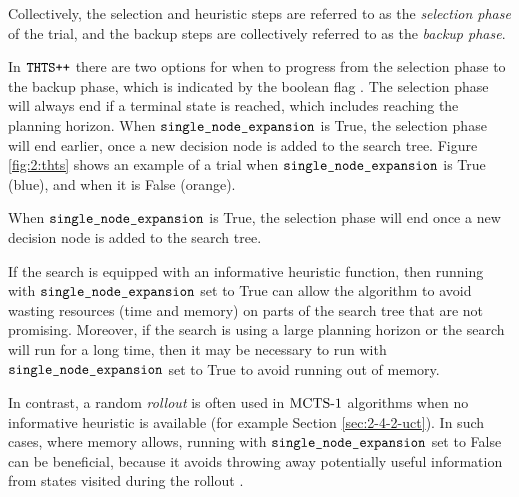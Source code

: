     Collectively, the selection and heuristic steps are referred to as the \textit{selection phase} of the trial, and the backup steps are collectively referred to as the \textit{backup phase}.

    In ${\textnormal{\texttt{THTS++}}}$ there are two options for when to progress from the selection phase to the backup phase, which is indicated by the boolean flag \mctsmode. The selection phase will always end if a terminal state is reached, which includes reaching the planning horizon. When ${\textnormal{\texttt{single\_node\_expansion}}}$ is True, the selection phase will end earlier, once a new decision node is added to the search tree. Figure \ref{fig:2:thts} shows an example of a trial when ${\textnormal{\texttt{single\_node\_expansion}}}$ is True (blue), and when it is False (orange).
    \begin{defn}
        \label{def:2:mctsmode}
        When ${\textnormal{\texttt{single\_node\_expansion}}}$ is True, the selection phase will end once a new decision node is added to the search tree.
    \end{defn} 

    If the search is equipped with an informative heuristic function, then running with ${\textnormal{\texttt{single\_node\_expansion}}}$ set to True can allow the algorithm to avoid wasting resources (time and memory) on parts of the search tree that are not promising. Moreover, if the search is using a large planning horizon or the search will run for a long time, then it may be necessary to run with ${\textnormal{\texttt{single\_node\_expansion}}}$ set to True to avoid running out of memory.

    In contrast, a random \textit{rollout} is often used in ${\textnormal{MCTS-1}}$ algorithms when no informative heuristic is available (for example Section \ref{sec:2-4-2-uct}). In such cases, where memory allows, running with ${\textnormal{\texttt{single\_node\_expansion}}}$ set to False can be beneficial, because it avoids throwing away potentially useful information from states visited during the rollout \cite{rollout_add,rollout_add_mcgs}.


